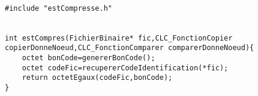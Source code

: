 \begin{verbatim}

#include "estCompresse.h"


int estCompres(FichierBinaire* fic,CLC_FonctionCopier copierDonneNoeud,CLC_FonctionComparer comparerDonneNoeud){
	octet bonCode=genererBonCode();
	octet codeFic=recupererCodeIdentification(*fic);
	return octetEgaux(codeFic,bonCode);
}

\end{verbatim}
 
